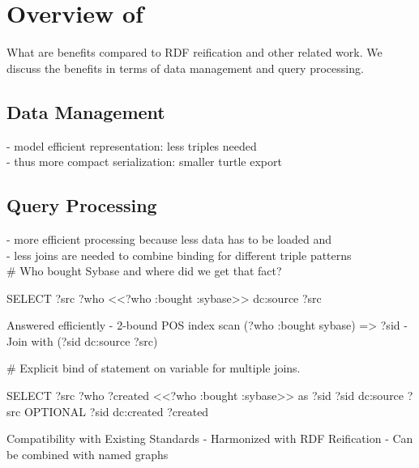 \section{Overview of {\ReifiPlus}}
What are benefits compared to RDF reification and other related work. We discuss the benefits in terms of data management and query processing.

\subsection{Data Management}
- model efficient representation: less triples needed\\
- thus more compact serialization: smaller turtle export\\

\subsection{Query Processing}
- more efficient processing because less data has to be loaded and \\
- less joins are needed to combine binding for different triple patterns\\


 \# Who bought Sybase and where did we get that fact?

SELECT ?src ?who {
   <<?who :bought :sybase>> dc:source ?src
}

Answered efficiently
-	2-bound POS index scan (?who :bought sybase) => ?sid
-	Join with (?sid dc:source ?src)

\# Explicit bind of statement on variable for multiple joins.

SELECT ?src ?who ?created {
   <<?who :bought :sybase>> as ?sid
   ?sid dc:source ?src
   OPTIONAL {?sid dc:created ?created}
}

Compatibility with Existing Standards
-	Harmonized with RDF Reification
-	Can be combined with named graphs

